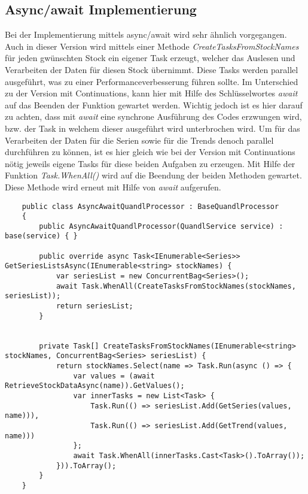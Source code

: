 \documentclass[a4paper,ngerman]{scrartcl}
\begin{document}
\subsection{Async/await Implementierung}
Bei der Implementierung mittels async/await wird sehr ähnlich vorgegangen. Auch in dieser Version wird mittels einer Methode \textit{CreateTasksFromStockNames} für jeden gwünschten Stock ein eigener Task erzeugt, welcher das Auslesen und Verarbeiten der Daten für diesen Stock übernimmt. Diese Tasks werden parallel ausgeführt, was zu einer Performanceverbesserung führen sollte. Im Unterschied zu der Version mit Continuations, kann hier mit Hilfe des Schlüsselwortes \textit{await} auf das Beenden der Funktion gewartet werden. Wichtig jedoch ist es hier darauf zu achten, dass mit \textit{await} eine synchrone Ausführung des Codes erzwungen wird, bzw. der Task in welchem dieser ausgeführt wird unterbrochen wird. Um für das Verarbeiten der Daten für die Serien sowie für die Trends denoch parallel durchführen zu können, ist es hier gleich wie bei der Version mit Continuations nötig jeweils eigene Tasks für diese beiden Aufgaben zu erzeugen. Mit Hilfe der Funktion \textit{Task.WhenAll()} wird auf die Beendung der beiden Methoden gewartet. Diese Methode wird erneut mit Hilfe von \textit{await} aufgerufen. 
\begin{lstlisting}
    public class AsyncAwaitQuandlProcessor : BaseQuandlProcessor
    {
        public AsyncAwaitQuandlProcessor(QuandlService service) : base(service) { }

        public override async Task<IEnumerable<Series>> GetSeriesListsAsync(IEnumerable<string> stockNames) {
            var seriesList = new ConcurrentBag<Series>();
            await Task.WhenAll(CreateTasksFromStockNames(stockNames, seriesList));
            return seriesList;
        }


        private Task[] CreateTasksFromStockNames(IEnumerable<string> stockNames, ConcurrentBag<Series> seriesList) {
            return stockNames.Select(name => Task.Run(async () => {
                var values = (await RetrieveStockDataAsync(name)).GetValues();
                var innerTasks = new List<Task> {
                    Task.Run(() => seriesList.Add(GetSeries(values, name))),
                    Task.Run(() => seriesList.Add(GetTrend(values, name)))
                };
                await Task.WhenAll(innerTasks.Cast<Task>().ToArray());
            })).ToArray();
        }
    }
\end{lstlisting}
\end{document}

